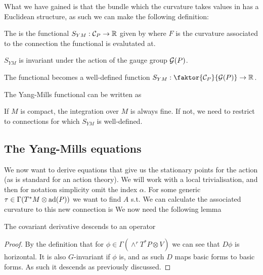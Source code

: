 \documentclass{article}
\begin{document}
What we have gained is that the bundle which the curvature takes values in has a Euclidean structure, as such we can make the following definition:

\begin{definition}
	The  is the functional $S_{YM}:\mathcal{C}_P \to \mathbb{R}$ given by 
where $F$ is the curvature associated to the connection the functional is evalutated at. 
\end{definition}

\begin{lemma}
	$S_{YM}$ is invariant under the action of the gauge group $\mathcal{G}(P)$. 
\end{lemma}

\begin{corollary}
	The functional becomes a well-defined function $S_{YM} : \faktor{\mc{C}_P}{\mc{G}(P)} \to \mbb{R}$. 
\end{corollary}

\begin{lemma}
	The Yang-Mills functional can be written as
\end{lemma}

\begin{remark}
	If $M$ is compact, the integration over $M$ is always fine. If not, we need to restrict to connections for which $S_{YM}$ is well-defined. 
\end{remark}

\subsection{The Yang-Mills equations}

We now want to derive equations that give us the stationary points for the action (as is standard for an action theory). We will work with a local trivialisation, and then for notation simplicity omit the index $\alpha$. For some generic $\tau \in \Gamma(T^\ast M \otimes \operatorname{ad}(P))$ we want to find $A$ s.t.  
We can calculate the associated curvature to this new connection is 
We now need the following lemma
\begin{lemma}
	The covariant derivative descends to an operator 
\end{lemma}
\begin{proof}
	By the definition that for $\phi \in \Gamma(\wedge^r T^\ast P \otimes V)$ 
we can see that $D\phi$ is horizontal. It is also $G$-invariant if $\phi$ is, and as such $D$ maps basic forms to basic forms. As such it descends as previously discussed.
\end{proof}
\end{document}
